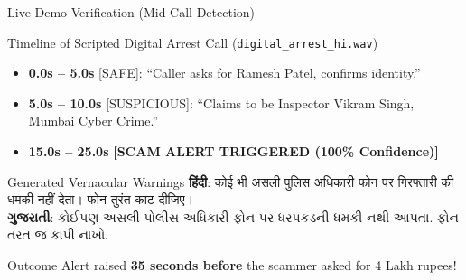 \documentclass[aspectratio=169,10pt]{beamer}
\begin{document}
\begin{frame}{Live Demo Verification (Mid-Call Detection)}
\begin{block}{Timeline of Scripted Digital Arrest Call (\texttt{digital\_arrest\_hi.wav})}
\begin{itemize}
    \item \textbf{0.0s -- 5.0s} [SAFE]: ``Caller asks for Ramesh Patel, confirms identity.''
    \item \textbf{5.0s -- 10.0s} [SUSPICIOUS]: ``Claims to be Inspector Vikram Singh, Mumbai Cyber Crime.''
    \item \textbf{15.0s -- 25.0s} \textbf{\color{rakshakRed}[SCAM ALERT TRIGGERED (100\% Confidence)]}
\end{itemize}
\end{block}

\begin{alertblock}{Generated Vernacular Warnings}
\textbf{हिंदी}: कोई भी असली पुलिस अधिकारी फोन पर गिरफ्तारी की धमकी नहीं देता। फोन तुरंत काट दीजिए। \\
\textbf{ગુજરાતી}: કોઈપણ અસલી પોલીસ અધિકારી ફોન પર ધરપકડની ધમકી નથી આપતા. ફોન તરત જ કાપી નાખો.
\end{alertblock}

\begin{exampleblock}{Outcome}
Alert raised \textbf{35 seconds before} the scammer asked for 4 Lakh rupees!
\end{exampleblock}
\end{frame}
\end{document}
